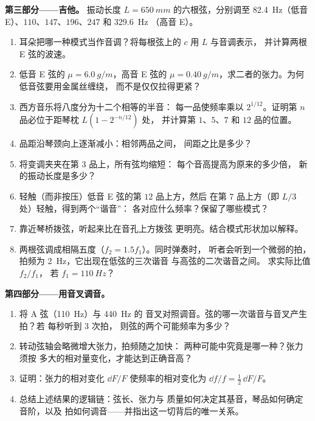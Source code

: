 \begin{problem}
\medskip
\noindent\textbf{第三部分——吉他。}
振动长度 $L = \qty{650}{mm}$ 的六根弦，分别调至
\qty{82.4}{Hz}（低音 E）、$110$、$147$、$196$、$247$ 和 \qty{329.6}{Hz}
（高音 E）。
\begin{enumerate}[resume]
  \item 耳朵把哪一种模式当作音调？将每根弦上的 $c$ 用 $L$ 与音调表示，
        并计算两根 E 弦的波速。
  \item 低音 E 弦的 $\mu = \qty{6.0}{g/m}$，高音 E 弦的
        $\mu = \qty{0.40}{g/m}$，求二者的张力。为何低音弦要用金属丝缠绕，
        而不是仅仅拉得更紧？
  \item 西方音乐将八度分为十二个相等的半音：
        每一品使频率乘以 $2^{1/12}$。证明第
        $n$ 品必位于距琴枕 $L(1 - 2^{-n/12})$ 处，
        并计算第 $1$、$5$、$7$ 和 $12$ 品的位置。
  \item 品距沿琴颈向上逐渐减小：相邻两品之间，
        间距之比是多少？
  \item 将变调夹夹在第 $3$ 品上，所有弦均缩短：
        每个音高提高为原来的多少倍，
        新的振动长度是多少？
  \item 轻触（而非按压）低音 E 弦的第 $12$ 品上方，然后
        在第 $7$ 品上方（即 $L/3$ 处）轻触，得到两个“谐音”：
        各对应什么频率？保留了哪些模式？
  \item 靠近琴桥拨弦，听起来比在音孔上方拨弦
        更明亮。结合模式形状加以解释。
  \item 两根弦调成相隔五度（$f_2 = 1.5f_1$）。同时弹奏时，
        听者会听到一个微弱的拍，拍频为 \qty{2}{Hz}，它出现在低弦的三次谐音
        与高弦的二次谐音之间。
        求实际比值 $f_2/f_1$，
        若 $f_1 = \qty{110}{Hz}$？
\end{enumerate}

\medskip
\noindent\textbf{第四部分——用音叉调音。}
\begin{enumerate}[resume]
  \item 将 A 弦（\qty{110}{Hz}）与 \qty{440}{Hz} 的
        音叉对照调音。弦的哪一次谐音与音叉产生拍？若
        每秒听到 \qty{3}{} 次拍，
        则弦的两个可能频率为多少？
  \item 转动弦轴会略微增大张力，拍频随之加快：
        两种可能中究竟是哪一种？张力须按
        多大的相对量变化，才能达到正确音高？
  \item 证明：张力的相对变化 $\dd F/F$ 使频率的相对变化为
        $\dd f/f = \tfrac12\,\dd F/F$。
  \item 总结上述结果的逻辑链：弦长、张力与
        质量如何决定其基音，琴品如何确定音阶，以及
        拍如何调音——并指出这一切背后的唯一关系。
\end{enumerate}
\end{problem}
